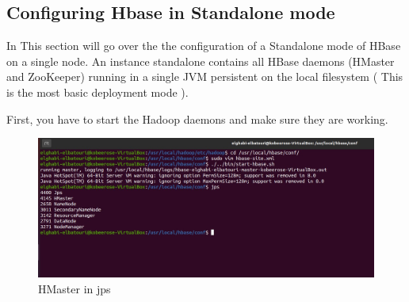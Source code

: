 \begin{spacing}{1.2}
\section{Configuring Hbase in Standalone mode }

\par In This section will go over the the configuration of a Standalone mode of HBase on a single node. An instance standalone contains all HBase daemons (HMaster and ZooKeeper) running in a single JVM persistent on the local filesystem ( This is the most basic deployment mode ).
\\

\par First, you have to start the Hadoop daemons and make sure they are working.
\\
\begin{figure}[!htb] 
\begin{center} 
\includegraphics[width=1\linewidth]{Pictures/HBase/Configuring Hbase in Standalone & Pseudo-distributed mode/Configuring Hbase in Standalone mode/HMaster in jps} 
\end{center} 
\caption{HMaster in jps} 
\end{figure}  \FloatBarrier
\\


\end{spacing}
